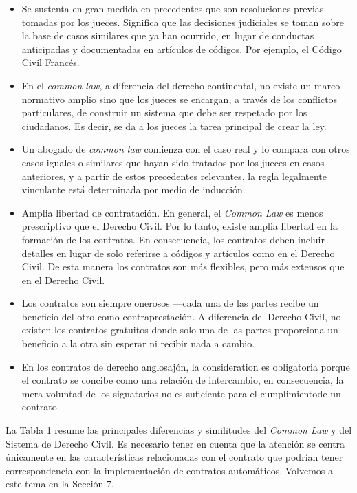 \documentclass[12pt]{report} %
\begin{document}
\begin{itemize}
    \item Se sustenta en gran medida en precedentes que son resoluciones previas tomadas por los jueces. Significa que las decisiones judiciales se toman sobre la base de casos similares que ya han ocurrido, en lugar de conductas anticipadas y documentadas en artículos de códigos. Por ejemplo, el Código Civil Francés.

\item En el \textit{common law}, a diferencia del derecho continental, no existe un marco normativo amplio sino que los jueces se encargan, a través de los conflictos particulares, de construir un sistema que debe ser respetado por los ciudadanos. Es decir, se da a los jueces la tarea principal de crear la ley.

\item Un abogado de \textit{common law} comienza con el caso real y lo compara con otros casos iguales o similares que hayan sido tratados por los jueces en casos anteriores, y a partir de estos precedentes relevantes, la regla legalmente vinculante está determinada por medio de inducción.

\item Amplia libertad de contratación. En general, el \textit{Common Law} es menos prescriptivo que el Derecho Civil. Por lo tanto, existe amplia libertad en la formación de los contratos. En consecuencia, los contratos deben incluir detalles en lugar de solo referirse a códigos y artículos como en el Derecho Civil. De esta manera los contratos son más flexibles, pero más extensos que en el Derecho Civil.

\item Los contratos son siempre onerosos —cada una de las partes recibe un beneficio del otro como contraprestación. A diferencia del Derecho Civil, no existen los contratos gratuitos donde solo una de las partes proporciona un beneficio a la otra sin esperar ni recibir nada a cambio.

\item En los contratos de derecho anglosajón, la consideration es obligatoria porque el contrato se concibe como una relación de intercambio, en consecuencia, la mera voluntad de los signatarios no es suficiente para el cumplimientode un contrato.    
    
\end{itemize}

La Tabla 1 resume las principales diferencias y similitudes del \textit{ Common Law} y del Sistema de Derecho Civil. Es necesario tener en cuenta que la atención se centra únicamente en las características relacionadas con el contrato que podrían tener correspondencia con la implementación de contratos automáticos. Volvemos a este tema en la Sección 7.
\end{document}

